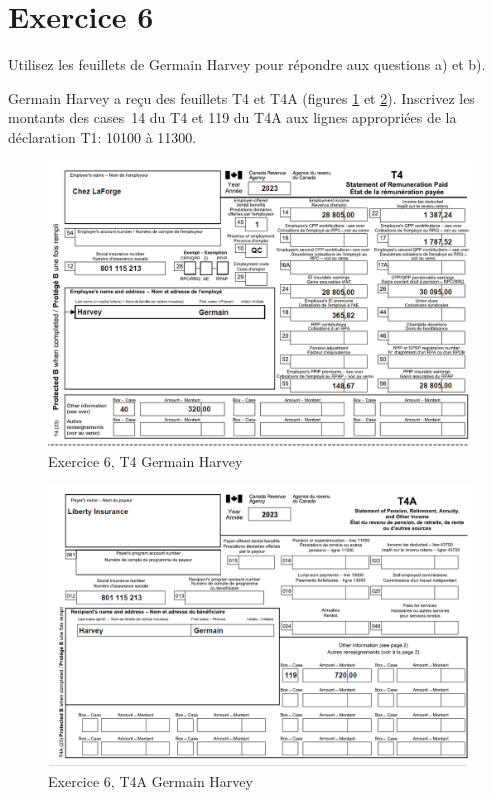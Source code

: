\section{Exercice 6}
\setcounter{question}{0}
\begin{question}
	Utilisez les feuillets de Germain Harvey pour répondre aux questions a) et b).
\end{question}
\setcounter{sousQuestion}{0}
\begin{sousQuestion}
	Germain Harvey a reçu des feuillets T4 et T4A (figures \ref{fig:Chap2Exercice6Q1T4} et \ref{fig:Chap2Exercice6Q1T4A}). Inscrivez les montants des cases~14 du T4 et 119 du T4A aux lignes appropriées de la déclaration T1: 10100 à 11300.
	\begin{figure}
		\centering
		\includegraphics[width=.9\textwidth]{exercice/2-6/Q1/a-T4.png}
		\caption{Exercice 6, T4 Germain Harvey}
		\label{fig:Chap2Exercice6Q1T4}
	\end{figure}
	\begin{figure}
		\centering
		\includegraphics[width=.9\textwidth]{exercice/2-6/Q1/a-T4A.png}
		\caption{Exercice 6, T4A Germain Harvey}
		\label{fig:Chap2Exercice6Q1T4A}
	\end{figure}
\end{sousQuestion}
